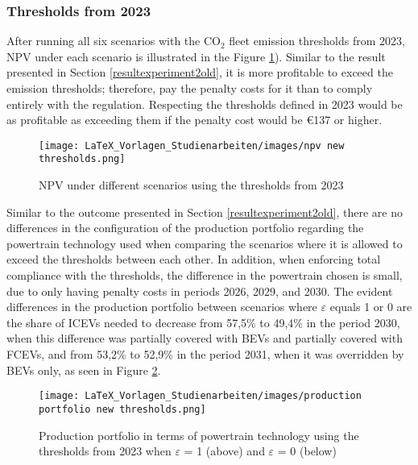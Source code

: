\subsubsection{Thresholds from 2023}\label{resultexperiment2new}
After running all six scenarios with the $\text{CO}_{2}$ fleet emission thresholds from 2023, \gls{NPV} under each scenario is illustrated in the Figure \ref{fig:NPV for New Thresholds}). Similar to the result presented in Section \ref{resultexperiment2old}, it is more profitable to exceed the emission thresholds; therefore, pay the penalty costs for it than to comply entirely with the regulation. Respecting the thresholds defined in 2023 would be as profitable as exceeding them if the penalty cost would be \euro{137} or higher. \\
\begin{figure}[h]
\begin{center}
\texttt{[image: LaTeX\_Vorlagen\_Studienarbeiten/images/npv new thresholds.png]}
\caption{\gls{NPV} under different scenarios using the thresholds from 2023}
\label{fig:NPV for New Thresholds}
\end{center}
\end{figure}
Similar to the outcome presented in Section \ref{resultexperiment2old},  there are no differences in the configuration of the production portfolio regarding the powertrain technology used when comparing the scenarios where it is allowed to exceed the thresholds between each other. In addition, when enforcing total compliance with the thresholds, the difference in the powertrain chosen is small, due to only having penalty costs in periods 2026, 2029, and 2030. The evident differences in the production portfolio between scenarios where $\varepsilon$ equals 1 or 0 are the share of \gls{ICEV}s needed to decrease from 57,5\% to 49,4\% in the period 2030, when this difference was partially covered with \gls{BEV}s and partially covered with \gls{FCEV}s, and from 53,2\% to 52,9\% in the period 2031, when it was overridden by \gls{BEV}s only, as seen in Figure \ref{fig:portfolio for new thresholds}.
\begin{figure}[H]
\begin{center}
\texttt{[image: LaTeX\_Vorlagen\_Studienarbeiten/images/production portfolio new thresholds.png]}
\caption{Production portfolio in terms of powertrain technology using the thresholds from 2023 when $\varepsilon$ = 1 (above) and $\varepsilon$ = 0 (below)}
\label{fig:portfolio for new thresholds}
\end{center}
\end{figure}

